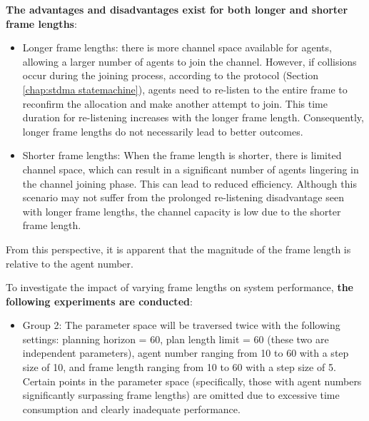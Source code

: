\textbf{The advantages and disadvantages exist for both longer and shorter frame lengths}:
\begin{itemize}
    \item Longer frame lengths:  there is more channel space available for agents, allowing a larger number of agents to join the channel. However, if collisions occur during the joining process, according to the protocol (Section \ref{chap:stdma statemachine}), agents need to re-listen to the entire frame to reconfirm the allocation and make another attempt to join. This time duration for re-listening increases with the longer frame length. Consequently, longer frame lengths do not necessarily lead to better outcomes.
    \item Shorter frame lengths: When the frame length is shorter, there is limited channel space, which can result in a significant number of agents lingering in the channel joining phase. This can lead to reduced efficiency. Although this scenario may not suffer from the prolonged re-listening disadvantage seen with longer frame lengths, the channel capacity is low due to the shorter frame length.
\end{itemize}

From this perspective, it is apparent that the magnitude of the frame length is relative to the agent number.

To investigate the impact of varying frame lengths on system performance, \textbf{the following experiments are conducted}:

\begin{itemize}
    \item Group 2: The parameter space will be traversed twice with the following settings: planning horizon = 60, plan length limit = 60 (these two are independent parameters), agent number ranging from 10 to 60 with a step size of 10, and frame length ranging from 10 to 60 with a step size of 5.
    Certain points in the parameter space (specifically, those with agent numbers significantly surpassing frame lengths) are omitted due to excessive time consumption and clearly inadequate performance.
\end{itemize}

